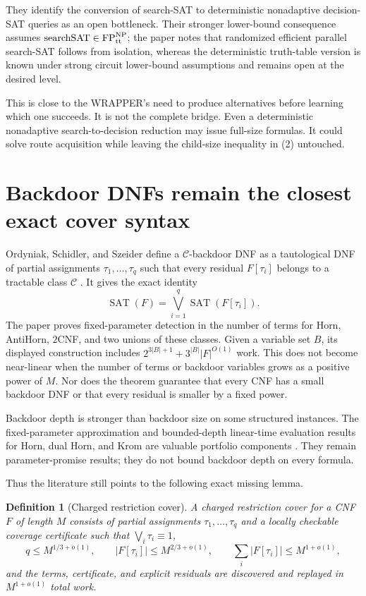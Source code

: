 \documentclass[11pt]{article}
\newtheorem{definition}[theorem]{Definition}
\newcommand{\SAT}{\operatorname{SAT}}
\begin{document}
They identify the conversion of search-SAT to deterministic nonadaptive
decision-SAT queries as an open bottleneck.  Their stronger lower-bound
consequence assumes
$\operatorname{searchSAT}\in\mathrm{FP}^{\mathrm{NP}}_{\rm tt}$; the paper
notes that randomized efficient parallel search-SAT follows from isolation,
whereas the deterministic truth-table version is known under strong circuit
lower-bound assumptions and remains open at the desired level.

This is close to the WRAPPER's need to produce alternatives before learning
which one succeeds.  It is not the complete bridge.  Even a deterministic
nonadaptive search-to-decision reduction may issue full-size formulas.  It
could solve route acquisition while leaving the child-size inequality in
(2) untouched.

\section{Backdoor DNFs remain the closest exact cover syntax}

Ordyniak, Schidler, and Szeider define a $\mathcal C$-backdoor DNF as a
tautological DNF of partial assignments
$\tau_1,\ldots,\tau_q$ such that every residual $F[\tau_i]$ belongs to a
tractable class $\mathcal C$ \cite{ordyniakschidlerszeider2021}.  It gives
the exact identity
\[
 \SAT(F)=\bigvee_{i=1}^q\SAT(F[\tau_i]).
\]
The paper proves fixed-parameter detection in the number of terms for Horn,
AntiHorn, $2$CNF, and two unions of these classes.  Given a variable set
$B$, its displayed construction includes
$2^{3|B|+1}+3^{|B|}|F|^{O(1)}$ work.  This does not become near-linear when
the number of terms or backdoor variables grows as a positive power of
$M$.  Nor does the theorem guarantee that every CNF has a small backdoor DNF
or that every residual is smaller by a fixed power.

Backdoor depth is stronger than backdoor size on some structured instances.
The fixed-parameter approximation and bounded-depth linear-time evaluation
results for Horn, dual Horn, and Krom are valuable portfolio components
\cite{gaspersszeider2024}.  They remain parameter-promise results; they do
not bound backdoor depth on every formula.

Thus the literature still points to the following exact missing lemma.

\begin{definition}[Charged restriction cover]\label{def:cover}
A charged restriction cover for a CNF $F$ of length $M$ consists of partial
assignments $\tau_1,\ldots,\tau_q$ and a locally checkable coverage
certificate such that $\bigvee_i\tau_i\equiv1$,
\[
 q\le M^{1/3+o(1)},\qquad
 |F[\tau_i]|\le M^{2/3+o(1)},\qquad
 \sum_i|F[\tau_i]|\le M^{1+o(1)},
\]
and the terms, certificate, and explicit residuals are discovered and
replayed in $M^{1+o(1)}$ total work.
\end{definition}
\end{document}
